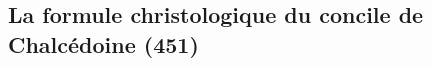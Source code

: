 \hypertarget{la-formule-christologique-du-concile-de-chalcuxe9doine-451}{%
\subsection{La formule christologique du concile de Chalcédoine
(451)}\label{la-formule-christologique-du-concile-de-chalcuxe9doine-451}}






\begin{table}[h!]
    \centering
    \footnotesize
 

 

\end{table}
